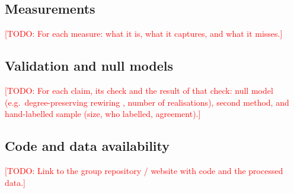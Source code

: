 \documentclass[9pt,twocolumn,twoside,lineno]{pnas-new}
\newcommand{\todo}[1]{\textcolor{red}{[TODO: #1]}}
\begin{document}
\subsection*{Measurements}
\todo{For each measure: what it is, what it captures, and what it misses.}

\subsection*{Validation and null models}
\todo{For each claim, its check and the result of that check: null model (e.g.\ degree-preserving rewiring \cite{maslov2002specificity}, number of realisations), second method, and hand-labelled sample (size, who labelled, agreement).}

\subsection*{Code and data availability}
\todo{Link to the group repository / website with code and the processed data.}


\end{document}
